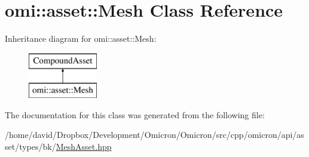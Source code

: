 \hypertarget{classomi_1_1asset_1_1_mesh}{}\section{omi\+:\+:asset\+:\+:Mesh Class Reference}
\label{classomi_1_1asset_1_1_mesh}
Inheritance diagram for omi\+:\+:asset\+:\+:Mesh\+:\begin{figure}[H]
\begin{center}
\leavevmode
\includegraphics[height=2.000000cm]{classomi_1_1asset_1_1_mesh}
\end{center}
\end{figure}


The documentation for this class was generated from the following file\+:\begin{DoxyCompactItemize}
\item 
/home/david/\+Dropbox/\+Development/\+Omicron/\+Omicron/src/cpp/omicron/api/asset/types/bk/\hyperlink{_mesh_asset_8hpp}{Mesh\+Asset.\+hpp}\end{DoxyCompactItemize}

